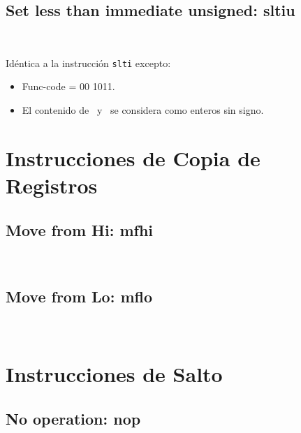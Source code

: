 \documentclass[12pt]{amsart}
\begin{document}
	
	
	\subsection{Set less than immediate unsigned: \textbf{sltiu}}\ 
	
	Idéntica a la instrucción \texttt{slti} excepto:
	\begin{itemize}
		\item Func-code = 00 1011.
		\item El contenido de \Rs\ y \Rt\ se considera como enteros sin signo.
	\end{itemize}

	\section{Instrucciones de Copia de Registros}
	
	\subsection{Move from Hi: \textbf{mfhi}}\ 
	
	
	
	\subsection{Move from Lo: \textbf{mflo}}\ 
	
	

	\section{Instrucciones de Salto}
	
	\subsection{No operation: \textbf{nop}}\ 
	
	
\end{document}
